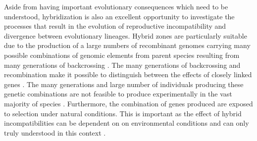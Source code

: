 Aside from having important evolutionary consequences which need to be understood, 
hybridization is also an excellent opportunity to investigate the processes
that result in the evolution of reproductive incompatibility and divergence between 
evolutionary lineages. 
Hybrid zones are particularly suitable due to the production of a large numbers of 
recombinant genomes carrying many possible combinations of genomic elements from parent 
species resulting from many generations of backcrossing \parencite{rieseberg1999}. 
The many generations of backcrossing and recombination make it possible to 
distinguish between the effects of closely linked genes \parencite{rieseberg1999}. 
The many generations and large number of individuals producing these genetic 
combinations are not feasible to produce experimentally in the vast majority of
species \parencite{rieseberg1999}. 
Furthermore, the combination of genes produced are exposed to selection 
under natural conditions. 
This is important as the effect of hybrid incompatibilities can be dependent on 
on environmental conditions and can only truly understood in this context \parencite{miller2016}. 

